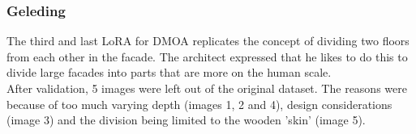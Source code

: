 \subsubsection{Geleding}
The third and last LoRA for DMOA replicates the concept of dividing two floors from each other in the facade. The architect expressed that he likes to do this to divide large facades into parts that are more on the human scale.\\
After validation, 5 images were left out of the original dataset. The reasons were because of too much varying depth (images 1, 2 and 4), design considerations (image 3) and the division being limited to the wooden 'skin' (image 5).
\begin{figure}[H]
  \centering
\end{figure}
